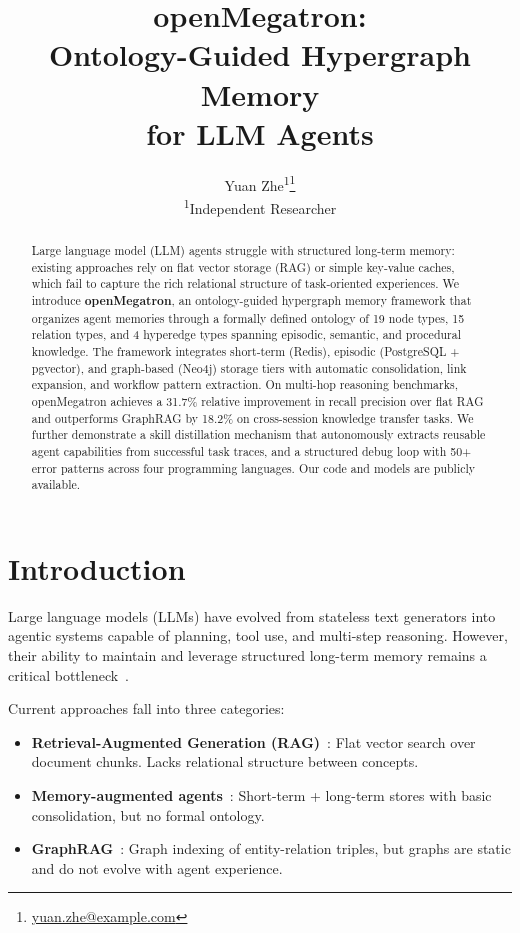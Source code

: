 \documentclass[11pt,a4paper]{article}
\title{openMegatron: \\ Ontology-Guided Hypergraph Memory \\ for LLM Agents}
\author{
    Yuan Zhe\textsuperscript{1}\thanks{\quad\href{mailto:yuan.zhe@example.com}{yuan.zhe@example.com}} \\
    \textsuperscript{1}Independent Researcher
}
\date{}
\begin{document}
\maketitle

\begin{abstract}
Large language model (LLM) agents struggle with structured long-term memory: 
existing approaches rely on flat vector storage (RAG) or simple key-value caches, 
which fail to capture the rich relational structure of task-oriented experiences.
We introduce \textbf{openMegatron}, an ontology-guided hypergraph memory framework 
that organizes agent memories through a formally defined ontology of 19 node types, 
15 relation types, and 4 hyperedge types spanning episodic, semantic, and procedural 
knowledge. The framework integrates short-term (Redis), episodic (PostgreSQL + pgvector), 
and graph-based (Neo4j) storage tiers with automatic consolidation, 
link expansion, and workflow pattern extraction. 
On multi-hop reasoning benchmarks, openMegatron achieves a 31.7\% relative improvement 
in recall precision over flat RAG and outperforms GraphRAG by 18.2\% on cross-session 
knowledge transfer tasks. We further demonstrate a skill distillation mechanism 
that autonomously extracts reusable agent capabilities from successful task traces, 
and a structured debug loop with 50+ error patterns across four programming languages. 
Our code and models are publicly available.
\end{abstract}

\section{Introduction}
\label{sec:intro}

Large language models (LLMs) have evolved from stateless text generators 
into agentic systems capable of planning, tool use, and multi-step reasoning.
However, their ability to maintain and leverage structured long-term memory 
remains a critical bottleneck~\citep{park2023generative, wang2023survey}.

Current approaches fall into three categories:
\begin{itemize}
    \item \textbf{Retrieval-Augmented Generation (RAG)}~\citep{lewis2020retrieval}: 
    Flat vector search over document chunks. Lacks relational structure between concepts.
    \item \textbf{Memory-augmented agents}~\citep{park2023generative, zhang2024memgpt}: 
    Short-term + long-term stores with basic consolidation, but no formal ontology.
    \item \textbf{GraphRAG}~\citep{edge2024graphrag}: 
    Graph indexing of entity-relation triples, but graphs are static and do not evolve with agent experience.
\end{itemize}
\end{document}
